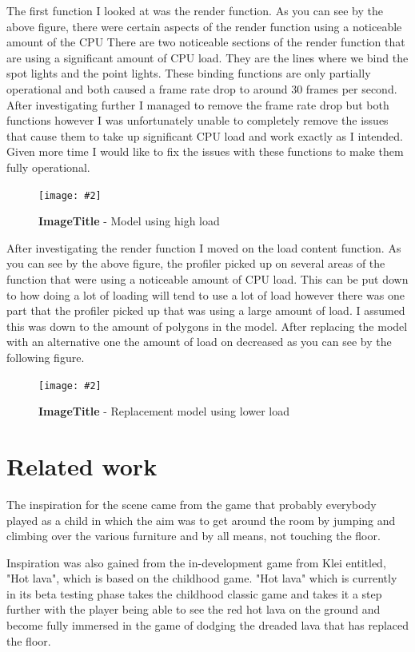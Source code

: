 \documentclass[10pt, a4paper]{article}
\newcommand{\figuremacro}[5]{
    \begin{figure}[#1]
        \centering
        \texttt{[image: \#2]}
        \caption[#3]{\textbf{#3}#4}
        \label{fig:#2}
    \end{figure}
}
\begin{document}
The first function I looked at was the render function. As you can see by the above figure, there were certain aspects of the render function using a noticeable amount of the CPU
There are two noticeable sections of the render function that are using a significant amount of CPU load. They are the lines where we bind the spot lights and the point lights.  
These binding functions are only partially operational and both caused a frame rate drop to around 30 frames per second. After investigating further I managed to remove the frame rate drop but 
both functions however I was unfortunately unable to completely remove the issues that cause them to take up significant CPU load and work exactly as I intended. Given more time I would
like to fix the issues with these functions to make them fully operational.

\figuremacro{h}{loadcontent.png}{ImageTitle}{ - Model using high load}{1.0}

After investigating the render function I moved on the load content function. As you can see by the above figure, the profiler picked up on several areas of the function that were using a noticeable amount of CPU load. This can be put down to how doing a lot of loading will tend to use a lot of load however there was one part that the profiler picked up that was using a large 
amount of load. I assumed this was down to the amount of polygons in the model. After replacing the model with an alternative one the amount of load on decreased as you can see by the following figure.

\figuremacro{h}{replacementloadcontent.png}{ImageTitle}{ - Replacement model using lower load}{0.8}





   
\section{Related work}

The inspiration for the scene came from the game that
probably everybody played as a child in which the aim
was to get around the room by jumping and climbing over
the various furniture and by all means, not touching the
floor.

Inspiration was also gained from the in-development
game from Klei entitled, "Hot lava", which is based on
the childhood game. "Hot lava" which is currently in its
beta testing phase takes the childhood classic game and
takes it a step further with the player being able to see the
red hot lava on the ground and become fully immersed in
the game of dodging the dreaded lava that has replaced
the floor.
\end{document}

